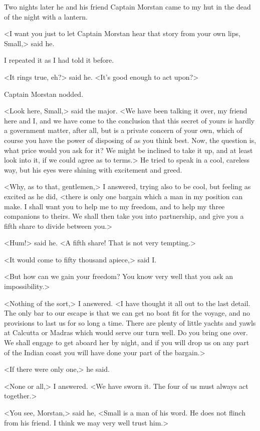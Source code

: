 Two nights later he and his friend Captain Morstan came to my hut in the dead of the night with a lantern.

<I want you just to let Captain Morstan hear that story from your own lips, Small,> said he.

I repeated it as I had told it before.

<It rings true, eh?> said he. <It's good enough to act upon?>

Captain Morstan nodded.

<Look here, Small,> said the major. <We have been talking it over, my friend here and I, and we have come to the conclusion that this secret of yours is hardly a government matter, after all, but is a private concern of your own, which of course you have the power of disposing of as you think best. Now, the question is, what price would you ask for it? We might be inclined to take it up, and at least look into it, if we could agree as to terms.> He tried to speak in a cool, careless way, but his eyes were shining with excitement and greed.

<Why, as to that, gentlemen,> I answered, trying also to be cool, but feeling as excited as he did, <there is only one bargain which a man in my position can make. I shall want you to help me to my freedom, and to help my three companions to theirs. We shall then take you into partnership, and give you a fifth share to divide between you.>

<Hum!> said he. <A fifth share! That is not very tempting.>

<It would come to fifty thousand apiece,> said I\@.

<But how can we gain your freedom? You know very well that you ask an impossibility.>

<Nothing of the sort,> I answered. <I have thought it all out to the last detail. The only bar to our escape is that we can get no boat fit for the voyage, and no provisions to last us for so long a time. There are plenty of little yachts and yawls at Calcutta or Madras which would serve our turn well. Do you bring one over. We shall engage to get aboard her by night, and if you will drop us on any part of the Indian coast you will have done your part of the bargain.>

<If there were only one,> he said.

<None or all,> I answered. <We have sworn it. The four of us must always act together.>

<You see, Morstan,> said he, <Small is a man of his word. He does not flinch from his friend. I think we may very well trust him.>

